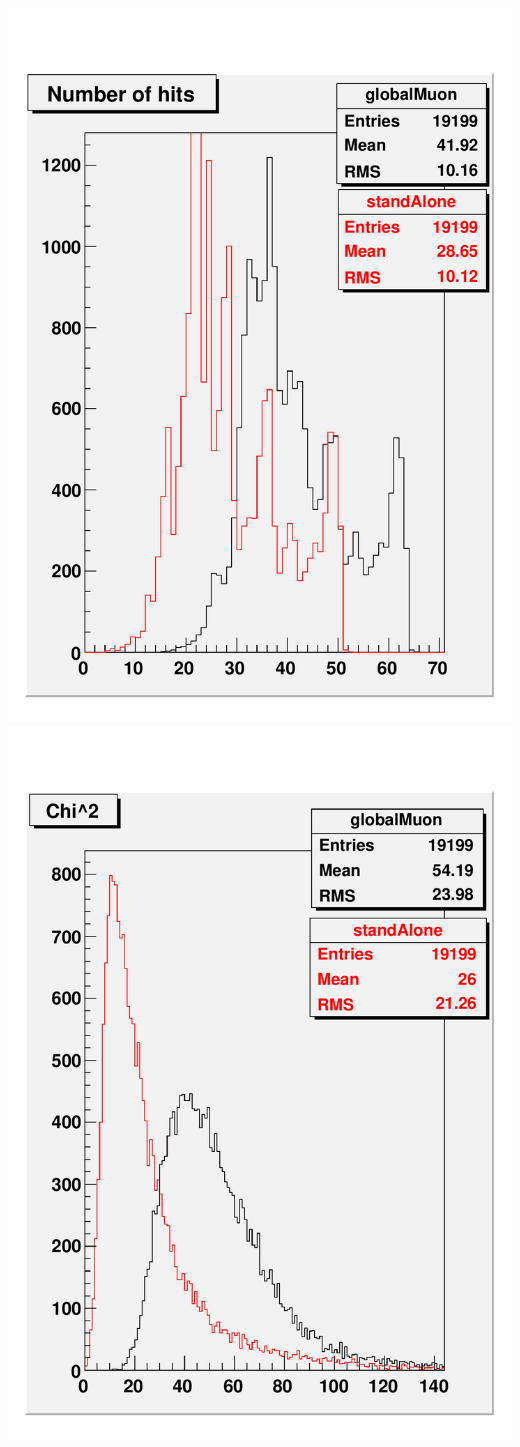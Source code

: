\documentclass[compress]{beamer}
\begin{document}
\begin{frame}
\includegraphics[width=0.5\linewidth]{nhits.pdf}
\includegraphics[width=0.5\linewidth]{chi2.pdf}
\end{frame}
\end{document}
